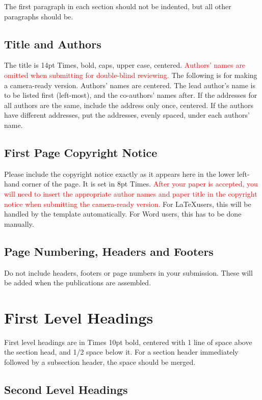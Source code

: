 \documentclass{article}
\begin{document}
The first paragraph in each section should not be indented, but all other paragraphs should be.

\subsection{Title and Authors}

The title is 14pt Times, bold, caps, upper case, centered.
\textcolor{red}{Authors' names are omitted when submitting for double-blind reviewing.}
The following is for making a camera-ready version.
Authors' names are centered.
The lead author's name is to be listed first (left-most), and the co-authors' names after.
If the addresses for all authors are the same, include the address only once, centered.
If the authors have different addresses, put the addresses, evenly spaced, under each authors' name.

\subsection{First Page Copyright Notice}

Please include the copyright notice exactly as it appears here in the lower left-hand corner of the page.
It is set in 8pt Times. \textcolor{red}{After your paper is accepted, you will need to insert the appropriate author names and paper title in the copyright notice when submitting the camera-ready version.} For \LaTeX users, this will be handled by the template automatically. For Word users, this has to be done manually.


\subsection{Page Numbering, Headers and Footers}

Do not include headers, footers or page numbers in your submission.
These will be added when the publications are assembled.

\section{First Level Headings}

First level headings are in Times 10pt bold,
centered with 1 line of space above the section head, and 1/2 space below it.
For a section header immediately followed by a subsection header, the space should be merged.

\subsection{Second Level Headings}
\end{document}
